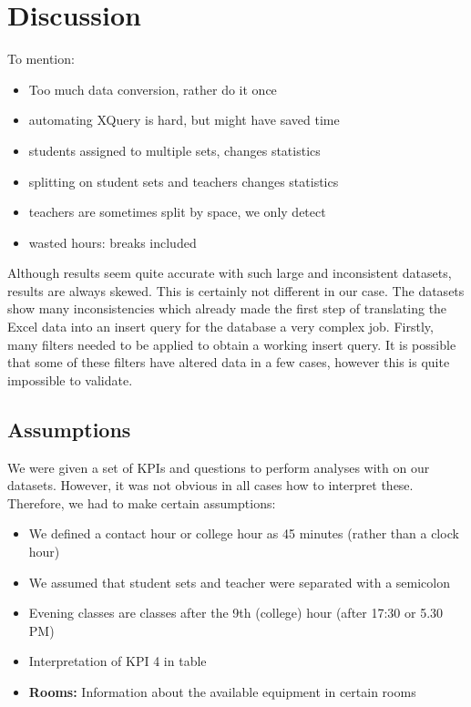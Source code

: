 \section{Discussion}
To mention:
\begin{itemize}
	\item Too much data conversion, rather do it once
	\item automating XQuery is hard, but might have saved time	
	\item students assigned to multiple sets, changes statistics
	\item splitting on student sets and teachers changes statistics
	\item teachers are sometimes split by space, we only detect \code{;}
	\item wasted hours: breaks included
\end{itemize}

Although results seem quite accurate with such large and inconsistent datasets, results are always skewed. This is certainly not different in our case. The datasets show many inconsistencies which already made the first step of translating the Excel data into an insert query for the database a very complex job. Firstly, many filters needed to be applied to obtain a working insert query. It is possible that some of these filters have altered data in a few cases, however this is quite impossible to validate.

\subsection{Assumptions}
We were given a set of KPIs and questions to perform analyses with on our datasets. However, it was not obvious in all cases how to interpret these. Therefore, we had to make certain assumptions:
\begin{itemize}
	\item We defined a contact hour or college hour as 45 minutes (rather than a clock hour)
	\item We assumed that student sets and teacher were separated with a semicolon
	\item Evening classes are classes after the 9th (college) hour (after 17:30 or 5.30 PM)
	\item Interpretation of KPI 4 in table
	\item\textbf{Rooms:} Information about the available equipment in certain rooms
\end{itemize}


